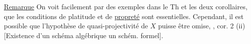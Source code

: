 
\uline{Remarque} On voit facilement par des exemples
dans le Th et les deux corollaires, que
les conditions de platitude et de \uline{propreté}
sont essentielles. Cependant, il  est
possible que l'hypothèse de quasi-projectivité de
$X$ 
puisse être omise, ,
cor. 2 (ii) [Existence d'un schéma
algébrique  un schém. formel].

